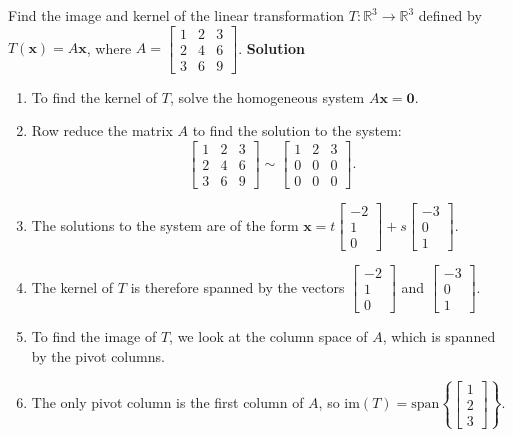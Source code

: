 \documentclass[8pt, a4paper, landscape]{extarticle}
\begin{document}
\begin{multicols*}{4}
  Find the image and kernel of the linear transformation $T: \mathbb{R}^3 \to \mathbb{R}^3$ defined by $T(\mathbf{x}) = A\mathbf{x}$, where $A = \begin{bmatrix} 1 & 2 & 3 \\ 2 & 4 & 6 \\ 3 & 6 & 9 \end{bmatrix}$.
  \textbf{Solution}
  \begin{enumerate}
    \item To find the kernel of $T$, solve the homogeneous system $A\mathbf{x} = \mathbf{0}$.
    \item Row reduce the matrix $A$ to find the solution to the system:
          \[
            \begin{bmatrix}
              1 & 2 & 3 \\
              2 & 4 & 6 \\
              3 & 6 & 9
            \end{bmatrix}
            \sim
            \begin{bmatrix}
              1 & 2 & 3 \\
              0 & 0 & 0 \\
              0 & 0 & 0
            \end{bmatrix}.
          \]
    \item The solutions to the system are of the form $\mathbf{x} = t\begin{bmatrix} -2 \\ 1 \\ 0 \end{bmatrix} + s\begin{bmatrix} -3 \\ 0 \\ 1 \end{bmatrix}$.
    \item The kernel of $T$ is therefore spanned by the vectors $\begin{bmatrix} -2 \\ 1 \\ 0 \end{bmatrix}$ and $\begin{bmatrix} -3 \\ 0 \\ 1 \end{bmatrix}$.
    \item To find the image of $T$, we look at the column space of $A$, which is spanned by the pivot columns.
    \item The only pivot column is the first column of $A$, so $\text{im}(T) = \text{span}\left\{\begin{bmatrix} 1 \\ 2 \\ 3 \end{bmatrix}\right\}$.
  \end{enumerate}


\end{multicols*}
\end{document}
